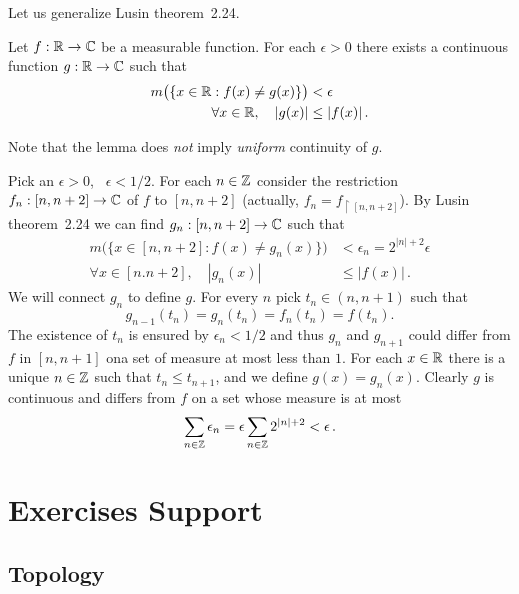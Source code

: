 Let us generalize 
Lusin theorem~2.24.
\begin{llem}
Let \(f:\mathbb{R}\to\mathbb{C}\) be a measurable function.
For each \(\epsilon>0\) there exists a continuous function \(g:\mathbb{R}\to\mathbb{C}\)
such that 
\begin{align*}
m\bigl(\{x\in\mathbb{R}: f(x)\neq g(x)\}\bigr) &< \epsilon\\
\forall x\in\mathbb{R},\quad |g(x)| &\leq |f(x)|\,.
\end{align*}
\end{llem}
Note that the lemma does \emph{not} imply \emph{uniform} continuity of $g$.
\\
\begin{thmproof}
Pick an \(\epsilon>0\), \wlogy\ \(\epsilon<1/2\).
For each \(n\in\mathbb{Z}\) consider the restriction
\(f_n:[n,n+2]\to\mathbb{C}\) of $f$ to \([n,n+2]\) 
(actually, \(f_n = f_{\restriction[n,n+2]}\)).
By Lusin theorem~2.24 we can find \(g_n:[n,n+2]\to\mathbb{C}\)
such that 
\begin{align*}
m\bigl(\{x\in[n,n+2]: f(x)\neq g_n(x)\}\bigr) &< \epsilon_n = 2^{|n|+2}\epsilon\\
\forall x\in[n.n+2],\quad |g_n(x)| &\leq |f(x)|\,.
\end{align*}
We will connect \(g_n\) to define $g$.
For every $n$ pick \(t_n\in(n, n+1)\) such that 
\begin{equation*}
g_{n-1}(t_n) = g_n(t_n) = f_n(t_n) = f(t_n).
\end{equation*}
The existence of \(t_n\) is ensured by \(\epsilon_n < 1/2\)
and thus \(g_n\) and \(g_{n+1}\) could differ from $f$ in \([n,n+1]\)
ona set of measure  at most less than $1$.
For each \(x\in\mathbb{R}\) there is a unique \(n\in\mathbb{Z}\) such that 
\(t_n \leq t_{n+1}\),  and we define \(g(x) = g_n(x)\).
Clearly $g$ is continuous and differs from $f$ on a set whose
measure is at most
\begin{equation*}
\sum_{n\in\mathbb{Z}}\epsilon_n = \epsilon \sum_{n\in\mathbb{Z}}  2^{|n|+2} < \epsilon\,.
\end{equation*}
\end{thmproof}

\section{Exercises Support}

\subsection{Topology}

